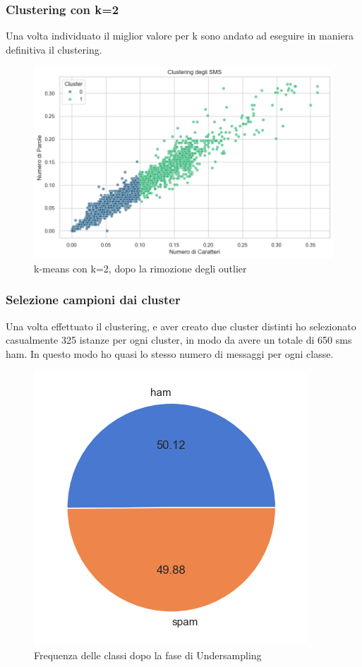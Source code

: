 \documentclass[]{article}
\begin{document}
            \subsubsection{Clustering con k=2}
                Una volta individuato il miglior valore per k sono andato ad eseguire in maniera definitiva il clustering.
                \begin{figure}[H]
                    \centering
                    \includegraphics[width=0.9\linewidth]{images/clust.png}
                    \caption{k-means con k=2, dopo la rimozione degli outlier}
                    \label{fig:enter-label}
                \end{figure}

            \subsubsection{Selezione campioni dai cluster}
                Una volta effettuato il clustering, e aver creato due cluster distinti ho selezionato casualmente 325 istanze per ogni cluster, in modo da avere un totale di 650 sms ham. In questo modo ho quasi lo stesso numero di messaggi per ogni classe.

                \begin{figure}[H]
                    \centering
                    \includegraphics[width=0.5\linewidth]{images/datasetBilanciato.png}
                    \caption{Frequenza delle classi dopo la fase di Undersampling}
                    \label{fig:enter-label}
                \end{figure}
\end{document}
